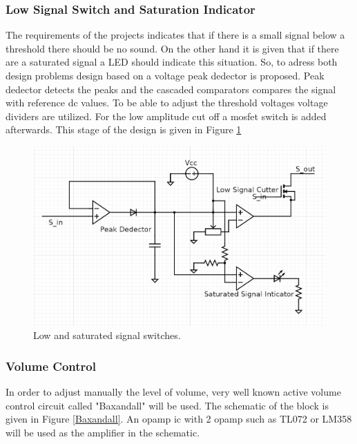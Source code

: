 \documentclass[a4paper,10pt]{IEEEtran}
\begin{document}
\subsubsection{Low Signal Switch and Saturation Indicator}
The requirements of the projects indicates that if there is a small signal below a threshold there should be no sound. On the other hand it is given that if there are a saturated signal a LED should indicate this situation. So, to adress both design problems design based on a voltage peak dedector is proposed. Peak dedector detects the peaks and the cascaded comparators compares the signal with reference dc values. To be able to adjust the threshold voltages voltage dividers are utilized. For the low amplitude cut off a mosfet switch is added afterwards. This stage of the design is given in Figure \ref*{saturated_ind} 
\begin{figure}[htbp!]
    \centering
    \includegraphics[width = 0.75\linewidth]{LowSignalSatSignal.png}
    \caption{Low and saturated signal switches.}
    \label{saturated_ind}    
\end{figure} 

\subsubsection{Volume Control}
In order to adjust manually the level of volume, very well known active volume control circuit called "Baxandall" will be used. The schematic of the block is given in Figure \ref*{Baxandall}. An opamp ic with 2 opamp such as TL072 or LM358 will be used as the amplifier in the schematic. 
\end{document}
